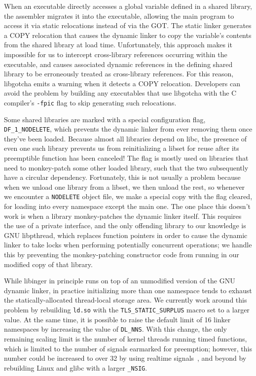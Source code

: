 When an executable directly accesses a global variable defined in a shared library,
the assembler migrates it into the executable, allowing the main program to access it
via static relocations instead of via the GOT.  The static linker generates a COPY
relocation that causes the dynamic linker to copy the variable's contents from the
shared library at load time.  Unfortunately, this approach makes
it impossible for us to intercept cross-library references occurring within the
executable, and causes associated dynamic references in the defining shared library
to be erroneously treated as cross-library references.  For this reason, libgotcha
emits a warning when it detects a COPY relocation.  Developers can avoid the problem
by building any executables that use libgotcha with the C compiler's \texttt{-fpic}
flag to skip generating such relocations.

Some shared libraries are marked with a special configuration flag,
\texttt{DF\_1\_NODELETE}, which prevents the dynamic linker from ever removing them
once they've been loaded.  Because almost all libraries depend on libc, the presence
of even one such library prevents us from reinitializing a libset for reuse after
its preemptible function has been canceled!  The flag is mostly used on libraries
that need
to monkey-patch some other loaded library, such that the two subsequently have a
circular dependency.  Fortunately, this is not usually a problem because when we
unload one library from a libset, we then unload the rest, so whenever we encounter a
\texttt{NODELETE} object file, we make a special copy with the flag cleared, for
loading into every namespace except the main one.  The one place this doesn't work is
when a library monkey-patches the dynamic linker itself.  This
requires the use of a private interface, and the only offending library to our
knowledge is GNU libpthread, which replaces function pointers in order to cause the
dynamic linker to take locks when performing potentially concurrent operations; we
handle this by preventing the monkey-patching constructor code from running in our
modified copy of that library.

While libinger in principle runs on top of an unmodified version of the GNU dynamic
linker, in practice initializing more than one namespace tends to exhaust the
statically-allocated thread-local storage area.  We currently work around this
problem by rebuilding \texttt{ld.so} with the \texttt{TLS\_STATIC\_SURPLUS} macro set
to a larger value.  At the same time, it is possible to raise the default limit
of 16 linker namespaces by increasing the value of \texttt{DL\_NNS}.  With this
change, the only remaining scaling limit is the number of kernel threads running
timed functions, which is limited to the number of signals earmarked for preemption;
however, this number could be increased to over 32 by using realtime
signals~\cite{signal-manpage}, and beyond by rebuilding Linux and glibc with a larger
\texttt{\_NSIG}.

